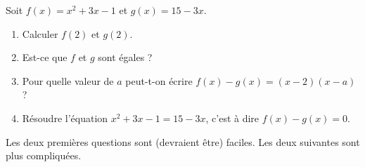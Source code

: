 
\begin{exercice}\label{exosmath-0045}

    Soit \( f(x)=x^2+3x-1\) et \( g(x)=15-3x\).
    \begin{enumerate}
        \item
            Calculer \( f(2)\) et \( g(2)\).
        \item
            Est-ce que \( f\) et \( g\) sont égales ?
        \item
            Pour quelle valeur de \( a\) peut-t-on écrire \( f(x)-g(x)=(x-2)(x-a)\) ?
        \item
            Résoudre l'équation \( x^2+3x-1=15-3x\), c'est à dire \( f(x)-g(x)=0\).
    \end{enumerate}
    Les deux premières questions sont (devraient être) faciles. Les deux suivantes sont plus compliquées.

\end{exercice}
